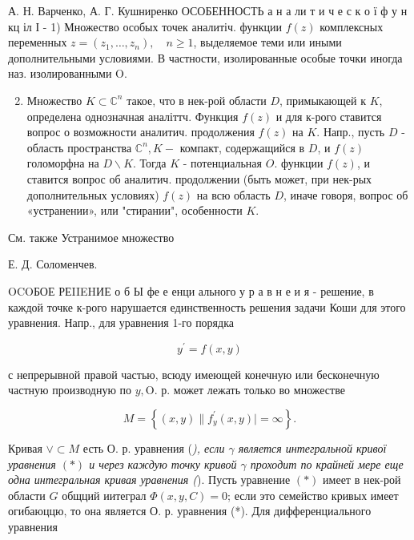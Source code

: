 \documentclass[10pt]{article}
\begin{document}
А. Н. Варченко, А. Г. Кушниренко ОСОБЕННОСТЬ а н а ли т и ч е с к о ї ф у н кц іл І - 1) Множество особых точек аналитіч. функции $f(z)$ комплексных переменных $z=\left(z_{1}, \ldots, z_{n}\right), \quad n \geqslant 1$, выделяемое теми или иными дополнительными условиями. В частности, изолированные особые точки иногда наз. изолированными $\mathrm{O}$.



\begin{enumerate}

  \setcounter{enumi}{1}

  \item Множество $K \subset \mathbb{C}^{n}$ такое, что в нек-рой области $D$, примыкающей к $K$, определена однозначная аналіттч. Функция $f(z)$ и для к-рого ставится вопрос о возможности аналитич. продолжения $f(z)$ на $K$. Напр., пусть $D$ - область пространства $\mathbb{C}^{n}, K-$ компакт, содержащийся в $D$, и $f(z)$ голоморфна на $D \backslash K$. Тогда $K$ - потенциальная $O$. функции $f(z)$, и ставится вопрос об аналитич. продолжении (быть может, при нек-рых дополнительных условиях) $f(z)$ на всю область $D$, иначе говоря, вопрос об «устранении», или "стирании", особенности $K$.

\end{enumerate}



См. также Устранимое множество



Е. Д. Соломенчев.



OCOБОЕ РЕIIEHИЕ о б Ы фе е енци ального у р а в н е и я - решение, в каждой точке к-рого нарушается единственность решения задачи Коши для этого уравнения. Напр., для уравнения 1-го порядка



\[

y^{\prime}=f(x, y)

\]



с непрерывной правой частью, всюду имеющей конечную или бесконечную частную производную по $y, \mathrm{O}$. р. может лежать только во множестве



\[

M=\left\{(x, y) \| f_{y}^{\prime}(x, y) \mid=\infty\right\} .

\]



Кривая $\vee \subset M$ есть О. р. уравнения (\textit{), если $\gamma$ является интегральной кривої уравнения $(*)$ и через каждую точку кривой $\gamma$ проходит по крайней мере еще одна интегральная кривая уравнения (}). Пусть уравнение $(*)$ имеет в нек-рой области $G$ общций иитеграл $\Phi(x, y, C)=0$; если это семейство кривых имеет огибаюццю, то она является О. р. уравнения (*). Для дифференциального уравнения
\end{document}
